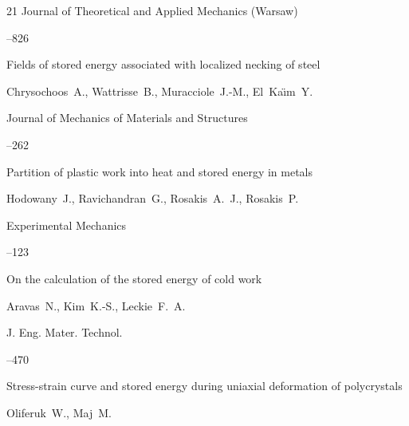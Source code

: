\begin{thebibliography}{21}
\jour Journal of Theoretical and Applied Mechanics (Warsaw)




--826




\paper  Fields of stored energy associated with localized necking of steel 

\by  Chrysochoos~A., Wattrisse~B., Muracciole~J.-M., El~Ka{\"\i}m~Y.

\jour Journal of Mechanics of Materials and Structures




--262





\paper  Partition of plastic work into heat and stored energy in metals 

\by  Hodowany~J., Ravichandran~G., Rosakis~A.~J., Rosakis~P.

\jour Experimental Mechanics




--123







\paper On the calculation of the stored energy of cold work

\by  Aravas~N., Kim~K.-S., Leckie~F.~A.

\jour J. Eng. Mater. Technol.




--470




\paper Stress-strain curve and stored energy during uniaxial deformation of  polycrystals

\by  Oliferuk~W., Maj~M.


\end{thebibliography}
